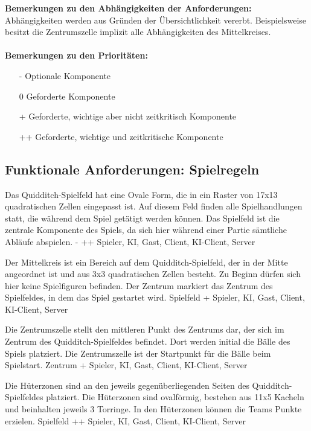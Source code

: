 \textbf{Bemerkungen zu den Abhängigkeiten der Anforderungen:} \\
Abhängigkeiten werden aus Gründen der Übersichtlichkeit vererbt. Beispielsweise besitzt die Zentrumszelle implizit alle Abhängigkeiten des Mittelkreises.  \\ \\
 \textbf{Bemerkungen zu den Prioritäten:} \\
 \begin{itemize}
    \item[-] Optionale Komponente
    \item[0] Geforderte Komponente
    \item[+] Geforderte, wichtige aber nicht zeitkritisch Komponente
    \item[++] Geforderte, wichtige und zeitkritische Komponente
 \end{itemize}

\subsection{Funktionale Anforderungen: Spielregeln} 

        {Das Quidditch-Spielfeld hat eine Ovale Form, die in ein Raster von 17x13 quadratischen Zellen eingepasst ist. Auf diesem Feld finden alle Spielhandlungen statt, die während dem Spiel getätigt werden können.}
        {Das Spielfeld ist die zentrale Komponente des Spiels, da sich hier während einer Partie sämtliche Abläufe abspielen.}
        {-}
        {++}
        {Spieler, KI, Gast, Client, KI-Client, Server}

        {Der Mittelkreis ist ein Bereich auf dem Quidditch-Spielfeld, der in der Mitte angeordnet ist und aus 3x3 quadratischen Zellen besteht. Zu Beginn dürfen sich hier keine Spielfiguren befinden.}
        {Der Zentrum markiert das Zentrum des Spielfeldes, in dem das Spiel gestartet wird.}
        {Spielfeld}
        {+}
        {Spieler, KI, Gast, Client, KI-Client, Server}

        {Die Zentrumszelle stellt den mittleren Punkt des Zentrums dar, der sich im Zentrum des Quidditch-Spielfeldes befindet. Dort werden initial die Bälle des Spiels platziert.}
        {Die Zentrumszelle ist der Startpunkt für die Bälle beim Spielstart.}
        {Zentrum}
        {+}
        {Spieler, KI, Gast, Client, KI-Client, Server}

        {Die Hüterzonen sind an den jeweils gegenüberliegenden Seiten des Quidditch-Spielfeldes platziert. Die Hüterzonen sind ovalförmig, bestehen aus 11x5 Kacheln und beinhalten jeweils 3 Torringe.}
        {In den Hüterzonen können die Teams Punkte erzielen.}
        {Spielfeld}
        {++}
        {Spieler, KI, Gast, Client, KI-Client, Server}
        
